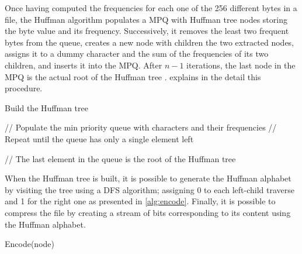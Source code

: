 Once having computed the frequencies for each one of the 256 different bytes in a file, the Huffman algorithm populates a MPQ with Huffman tree nodes storing the byte value and its frequency. Successively, it removes the least two frequent bytes from the queue, creates a new node with children the two extracted nodes, assigns it to a dummy character and the sum of the frequencies of its two children, and inserts it into the MPQ. After \(n-1\) iterations, the last node in the MPQ is the actual root of the Huffman tree \cite{bertossi2010algoritmi}.  explains in the detail this procedure.
\begin{algorithm}
    \caption{Build the Huffman tree}\label{alg:buildtree}

    \SetKwFor{}{}{}{}

    // Populate the min priority queue with characters and their frequencies\;
    // Repeat until the queue has only a single element left\;

    // The last element in the queue is the root of the Huffman tree\;
    \;
\end{algorithm}

When the Huffman tree is built, it is possible to generate the Huffman alphabet by visiting the tree using a DFS algorithm; assigning 0 to each left-child traverse and 1 for the right one as presented in \cref{alg:encode}. Finally, it is possible to compress the file by creating a stream of bits corresponding to its content using the Huffman alphabet.

\begin{algorithm}
    \caption{Encode(node)}\label{alg:encode}
\end{algorithm}

